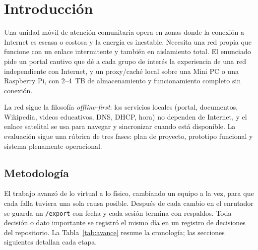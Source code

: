 \documentclass[conference]{IEEEtran}
\begin{document}
\section{Introducción}
Una unidad móvil de atención comunitaria opera en zonas donde la conexión a Internet es escasa o costosa y la energía es inestable. Necesita una red propia que funcione con un enlace intermitente y también en aislamiento total. El enunciado pide un portal cautivo que dé a cada grupo de interés la experiencia de una red independiente con Internet, y un proxy/caché local sobre una Mini PC o una Raspberry Pi, con 2--4~TB de almacenamiento y funcionamiento completo sin conexión.

La red sigue la filosofía \textit{offline-first}: los servicios locales (portal, documentos, Wikipedia, videos educativos, DNS, DHCP, hora) no dependen de Internet, y el enlace satelital se usa para navegar y sincronizar cuando está disponible. La evaluación sigue una rúbrica de tres fases: plan de proyecto, prototipo funcional y sistema plenamente operacional.

\subsection{Metodología}
El trabajo avanzó de lo virtual a lo físico, cambiando un equipo a la vez, para que cada falla tuviera una sola causa posible. Después de cada cambio en el enrutador se guarda un \texttt{/export} con fecha y cada sesión termina con respaldos. Toda decisión o dato importante se registró el mismo día en un registro de decisiones del repositorio. La Tabla~\ref{tab:avance} resume la cronología; las secciones siguientes detallan cada etapa.
\end{document}
